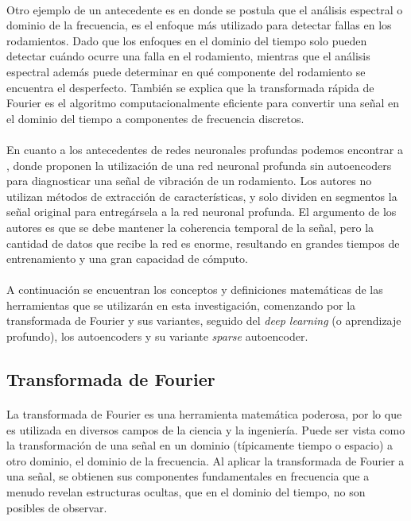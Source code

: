 \documentclass[12pt]{article}%
\begin{document}
\paragraph{}
Otro ejemplo de un antecedente es \cite{kanpaj} en donde se postula que el análisis espectral o dominio de la frecuencia, es el enfoque más utilizado para detectar fallas en los rodamientos. Dado que los enfoques en el dominio del tiempo solo pueden detectar cuándo ocurre una falla en el rodamiento, mientras que el análisis espectral además puede determinar en qué componente del rodamiento se encuentra el desperfecto. También se explica que la transformada rápida de Fourier es el algoritmo computacionalmente eficiente para convertir una señal en el dominio del tiempo a componentes de frecuencia discretos.

\paragraph{}
En cuanto a los antecedentes de redes neuronales profundas podemos encontrar a \cite{ran}, donde proponen la utilización de una red neuronal profunda sin autoencoders para diagnosticar una señal de vibración de un rodamiento. Los autores no utilizan métodos de extracción de características, y solo dividen en segmentos la señal original para entregársela a la red neuronal profunda. El argumento de los autores es que se debe mantener la coherencia temporal de la señal, pero la cantidad de datos que recibe la red es enorme, resultando en grandes tiempos de entrenamiento y una gran capacidad de cómputo.

\paragraph{}
A continuación se encuentran los conceptos y definiciones matemáticas de las herramientas que se utilizarán en esta investigación, comenzando por la transformada de Fourier y sus variantes, seguido del \textit{deep learning} (o aprendizaje profundo), los autoencoders y su variante \textit{sparse} autoencoder.

\subsection{Transformada de Fourier}
\paragraph{}
La transformada de Fourier es una herramienta matemática poderosa, por lo que es utilizada en diversos campos de la ciencia y la ingeniería. Puede ser vista como la transformación de una señal en un dominio (típicamente tiempo o espacio) a otro dominio, el dominio de la frecuencia. Al aplicar la transformada de Fourier a una señal, se obtienen sus componentes fundamentales en frecuencia que a menudo revelan estructuras ocultas, que en el dominio del tiempo, no son posibles de observar.
\end{document}
